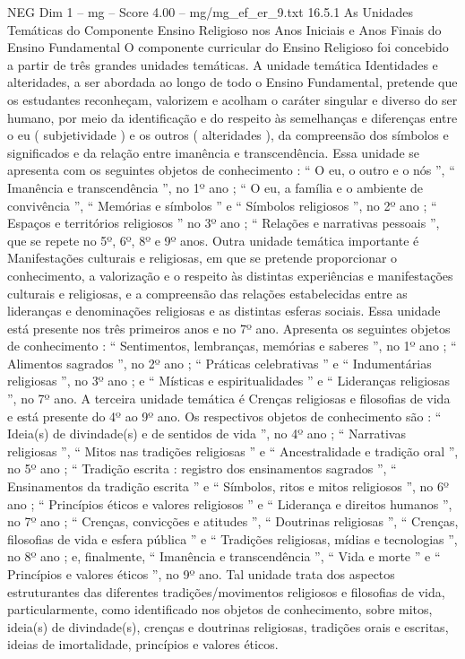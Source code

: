 \begin{textsample}{NEG Dim 1 – mg – Score 4.00 – mg/mg\_ef\_er\_9.txt}  \label{ex:f1_neg_060}
16.5.1 As Unidades Temáticas do Componente Ensino Religioso nos Anos Iniciais e Anos Finais do Ensino Fundamental O componente curricular do Ensino Religioso foi concebido a partir de três grandes unidades temáticas.
A unidade temática Identidades e alteridades, a ser abordada ao longo de todo o Ensino Fundamental, pretende que os estudantes reconheçam, valorizem e acolham o caráter singular e diverso do ser humano, por meio da identificação e do respeito às semelhanças e diferenças entre o eu ( subjetividade ) e os outros ( alteridades ), da compreensão dos símbolos e significados e da relação entre imanência e transcendência.
Essa unidade se apresenta com os seguintes objetos de conhecimento : “ O eu, o outro e o nós ”, “ Imanência e transcendência ”, no 1º ano ; “ O eu, a família e o ambiente de convivência ”, “ Memórias e símbolos ” e “ Símbolos religiosos ”, no 2º ano ; “ Espaços e territórios religiosos ” no 3º ano ; “ Relações e narrativas pessoais ”, que se repete no 5º, 6º, 8º e 9º anos.
Outra unidade temática importante é Manifestações culturais e religiosas, em que se pretende proporcionar o conhecimento, a valorização e o respeito às distintas experiências e manifestações culturais e religiosas, e a compreensão das relações estabelecidas entre as lideranças e denominações religiosas e as distintas esferas sociais.
Essa unidade está presente nos três primeiros anos e no 7º ano.
Apresenta os seguintes objetos de conhecimento : “ Sentimentos, lembranças, memórias e saberes ”, no 1º ano ; “ Alimentos sagrados ”, no 2º ano ; “ Práticas celebrativas ” e “ Indumentárias religiosas ”, no 3º ano ; e “ Místicas e espiritualidades ” e “ Lideranças religiosas ”, no 7º ano.
A terceira unidade temática é Crenças religiosas e filosofias de vida e está presente do 4º ao 9º ano.
Os respectivos objetos de conhecimento são : “ Ideia(s) de divindade(s) e de sentidos de vida ”, no 4º ano ; “ Narrativas religiosas ”, “ Mitos nas tradições religiosas ” e “ Ancestralidade e tradição oral ”, no 5º ano ; “ Tradição escrita : registro dos ensinamentos sagrados ”, “ Ensinamentos da tradição escrita ” e “ Símbolos, ritos e mitos religiosos ”, no 6º ano ; “ Princípios éticos e valores religiosos ” e “ Liderança e direitos humanos ”, no 7º ano ; “ Crenças, convicções e atitudes ”, “ Doutrinas religiosas ”, “ Crenças, filosofias de vida e esfera pública ” e “ Tradições religiosas, mídias e tecnologias ”, no 8º ano ; e, finalmente, “ Imanência e transcendência ”, “ Vida e morte ” e “ Princípios e valores éticos ”, no 9º ano.
Tal unidade trata dos aspectos estruturantes das diferentes tradições/movimentos religiosos e filosofias de vida, particularmente, como identificado nos objetos de conhecimento, sobre mitos, ideia(s) de divindade(s), crenças e doutrinas religiosas, tradições orais e escritas, ideias de imortalidade, princípios e valores éticos.

\end{textsample}
